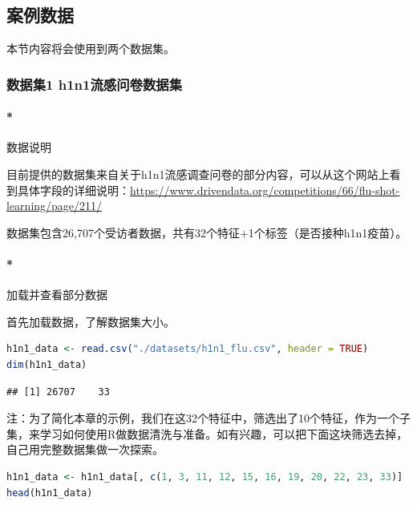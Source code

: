 \documentclass[]{ctexbook}
\let\oldparagraph\paragraph
\renewcommand{\paragraph}[1]{\oldparagraph{#1}\mbox{}}
\begin{document}
\hypertarget{ux6848ux4f8bux6570ux636e}{%
\subsection*{案例数据}\label{ux6848ux4f8bux6570ux636e}}


本节内容将会使用到两个数据集。

\hypertarget{ux6570ux636eux96c61-h1n1ux6d41ux611fux95eeux5377ux6570ux636eux96c6}{%
\subsubsection*{数据集1 h1n1流感问卷数据集}\label{ux6570ux636eux96c61-h1n1ux6d41ux611fux95eeux5377ux6570ux636eux96c6}}


\hypertarget{ux6570ux636eux8bf4ux660e}{%
\paragraph*{数据说明}\label{ux6570ux636eux8bf4ux660e}}

目前提供的数据集来自关于h1n1流感调查问卷的部分内容，可以从这个网站上看到具体字段的详细说明：\url{https://www.drivendata.org/competitions/66/flu-shot-learning/page/211/}

数据集包含26,707个受访者数据，共有32个特征+1个标签（是否接种h1n1疫苗）。

\hypertarget{ux52a0ux8f7dux5e76ux67e5ux770bux90e8ux5206ux6570ux636e}{%
\paragraph*{加载并查看部分数据}\label{ux52a0ux8f7dux5e76ux67e5ux770bux90e8ux5206ux6570ux636e}}

首先加载数据，了解数据集大小。

\begin{lstlisting}[language=R]
h1n1_data <- read.csv("./datasets/h1n1_flu.csv", header = TRUE)
dim(h1n1_data)
\end{lstlisting}

\begin{lstlisting}
## [1] 26707    33
\end{lstlisting}

注：为了简化本章的示例，我们在这32个特征中，筛选出了10个特征，作为一个子集，来学习如何使用R做数据清洗与准备。如有兴趣，可以把下面这块筛选去掉，自己用完整数据集做一次探索。

\begin{lstlisting}[language=R]
h1n1_data <- h1n1_data[, c(1, 3, 11, 12, 15, 16, 19, 20, 22, 23, 33)]
head(h1n1_data)
\end{lstlisting}
\end{document}
